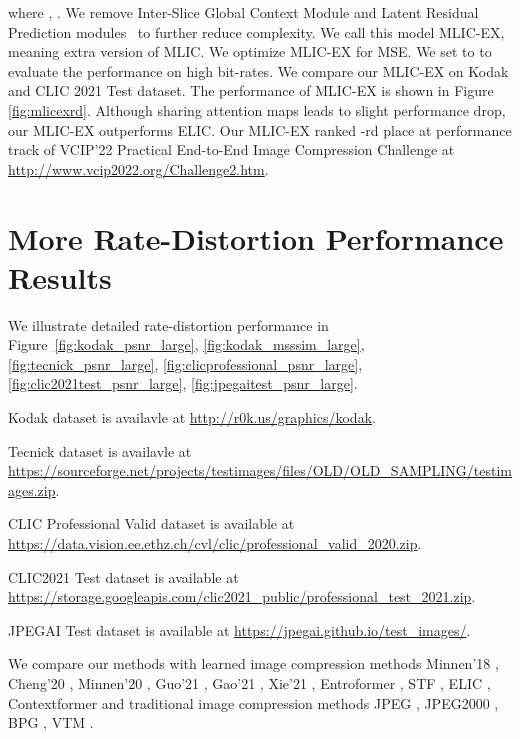 \documentclass[sigconf]{acmart}
\begin{document}
where , .
We remove Inter-Slice Global Context Module and Latent Residual Prediction modules~\cite{DBLP:conf/icip/MinnenS20}
to further reduce complexity.
We call this model MLIC-EX, meaning extra version of MLIC.
We optimize MLIC-EX for MSE. We set  to  to evaluate
the performance on high bit-rates. We compare our MLIC-EX on Kodak and CLIC 2021 Test dataset.
The performance of MLIC-EX is shown in Figure \ref{fig:mlicexrd}. Although
sharing attention maps leads to slight performance drop, our MLIC-EX outperforms ELIC.
Our MLIC-EX ranked {\bm{}}-rd place at performance track of
VCIP'22 Practical End-to-End Image Compression Challenge at
\url{http://www.vcip2022.org/Challenge2.htm}.
\section{More Rate-Distortion Performance Results}
We illustrate detailed rate-distortion performance in Figure~\ref{fig:kodak_psnr_large}, \ref{fig:kodak_msssim_large},
 \ref{fig:tecnick_psnr_large}, \ref{fig:clicprofessional_psnr_large}, \ref{fig:clic2021test_psnr_large}, \ref{fig:jpegaitest_psnr_large}.\par
Kodak dataset is availavle at \url{http://r0k.us/graphics/kodak}.\par Tecnick dataset is availavle at \url{https://sourceforge.net/projects/testimages/files/OLD/OLD_SAMPLING/testimages.zip}.\par
CLIC Professional Valid dataset is available at \url{https://data.vision.ee.ethz.ch/cvl/clic/professional_valid_2020.zip}.\par
CLIC2021 Test dataset is available at \url{https://storage.googleapis.com/clic2021_public/professional_test_2021.zip}.\par
JPEGAI Test dataset is available at \url{https://jpegai.github.io/test_images/}.\par
We compare our methods with learned image compression methods Minnen'18 \cite{DBLP:conf/nips/MinnenBT18}, Cheng'20 \cite{DBLP:conf/cvpr/ChengSTK20}, Minnen'20 \cite{DBLP:conf/icip/MinnenS20}, Guo'21 \cite{ DBLP:journals/tcsv/GuoZFC22}, Gao'21 \cite{DBLP:conf/iccv/GaoYPHZDL21}, Xie'21 \cite{DBLP:conf/mm/XieCC21}, Entroformer \cite{DBLP:journals/corr/abs-2202-05492}, STF \cite{DBLP:journals/corr/abs-2203-08450},
ELIC \cite{He_2022_CVPR}, Contextformer \cite{koyuncu2022contextformer} and traditional image compression methods JPEG \cite{JPEG-ITU1992Information}, JPEG2000 \cite{DBLP:conf/icmcs/CharrierCL99}, BPG \cite{bpg}, VTM \cite{vtm2019}. \par
\end{document}
